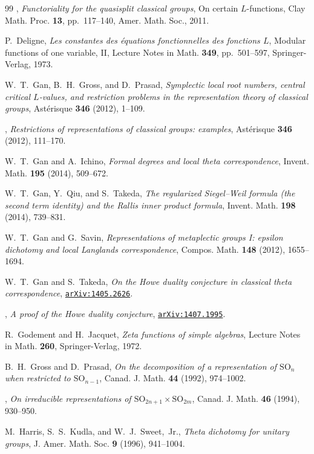 \documentclass[11pt]{amsart}
\numberwithin{equation}{section}
\theoremstyle{plain}
\theoremstyle{definition}
\theoremstyle{remark}
\begin{document}
\begin{thebibliography}{99}
\bysame,
\emph{Functoriality for the quasisplit classical groups},
On certain $L$-functions,
Clay Math. Proc. \textbf{13}, pp.~117--140, Amer. Math. Soc., 2011.

P.~Deligne,
\emph{Les constantes des \'equations fonctionnelles des fonctions $L$},
Modular functions of one variable, II,
Lecture Notes in Math. \textbf{349}, pp.~501--597, Springer-Verlag, 1973.

W.~T.~Gan, B.~H.~Gross, and D.~Prasad,
\emph{Symplectic local root numbers, central critical $L$-values, and restriction problems in the representation theory of classical groups},
Ast\'erisque \textbf{346} (2012), 1--109.

\bysame,
\emph{Restrictions of representations of classical groups: examples},
Ast\'erisque \textbf{346} (2012), 111--170.

W.~T.~Gan and A.~Ichino,
\emph{Formal degrees and local theta correspondence},
Invent. Math. \textbf{195} (2014), 509--672.

W.~T.~Gan, Y.~Qiu, and S.~Takeda, 
\emph{The regularized Siegel--Weil formula (the second term identity) and the Rallis inner product formula},
Invent. Math. \textbf{198} (2014), 739--831.

W.~T.~Gan and G.~Savin,
\emph{Representations of metaplectic groups I: epsilon dichotomy and local Langlands correspondence},
Compos. Math. \textbf{148} (2012), 1655--1694.

W.~T.~Gan and S.~Takeda,
\emph{On the Howe duality conjecture in classical theta correspondence},
\href{http://arxiv.org/abs/1405.2626}{\texttt{arXiv:1405.2626}}.

\bysame,
\emph{A proof of the Howe duality conjecture},
\href{http://arxiv.org/abs/1407.1995}{\texttt{arXiv:1407.1995}}.

R.~Godement and H.~Jacquet,
\emph{Zeta functions of simple algebras},
Lecture Notes in Math. \textbf{260}, Springer-Verlag, 1972.

B.~H.~Gross and D.~Prasad,
\emph{On the decomposition of a representation of $\mathrm{SO}_n$ when restricted to $\mathrm{SO}_{n-1}$},
Canad. J. Math. \textbf{44} (1992), 974--1002.

\bysame,
\emph{On irreducible representations of $\mathrm{SO}_{2n+1} \times \mathrm{SO}_{2m}$},
Canad. J. Math. \textbf{46} (1994), 930--950.

M.~Harris, S.~S.~Kudla, and W.~J.~Sweet,~Jr., 
\emph{Theta dichotomy for unitary groups}, 
J. Amer. Math. Soc. \textbf{9} (1996), 941--1004.


\end{thebibliography}
\end{document}
